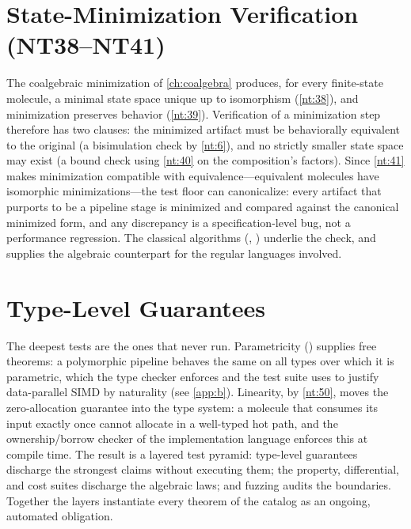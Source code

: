 \section{State-Minimization Verification (NT38--NT41)}
The coalgebraic minimization of \autoref{ch:coalgebra} produces, for every finite-state molecule, a minimal state space unique up to isomorphism (\ref{nt:38}), and minimization preserves behavior (\ref{nt:39}). Verification of a minimization step therefore has two clauses: the minimized artifact must be behaviorally equivalent to the original (a bisimulation check by \ref{nt:6}), and no strictly smaller state space may exist (a bound check using \ref{nt:40} on the composition's factors). Since \ref{nt:41} makes minimization compatible with equivalence---equivalent molecules have isomorphic minimizations---the test floor can canonicalize: every artifact that purports to be a pipeline stage is minimized and compared against the canonical minimized form, and any discrepancy is a specification-level bug, not a performance regression. The classical algorithms (\cite{nerode}, \cite{hopcroft}) underlie the check, and \cite{brzozowski} supplies the algebraic counterpart for the regular languages involved.

\section{Type-Level Guarantees}
The deepest tests are the ones that never run. Parametricity (\cite{wadler}) supplies free theorems: a polymorphic pipeline behaves the same on all types over which it is parametric, which the type checker enforces and the test suite uses to justify data-parallel SIMD by naturality (see \autoref{app:b}). Linearity, by \ref{nt:50}, moves the zero-allocation guarantee into the type system: a molecule that consumes its input exactly once cannot allocate in a well-typed hot path, and the ownership/borrow checker of the implementation language enforces this at compile time. The result is a layered test pyramid: type-level guarantees discharge the strongest claims without executing them; the property, differential, and cost suites discharge the algebraic laws; and fuzzing audits the boundaries. Together the layers instantiate every theorem of the catalog as an ongoing, automated obligation.
